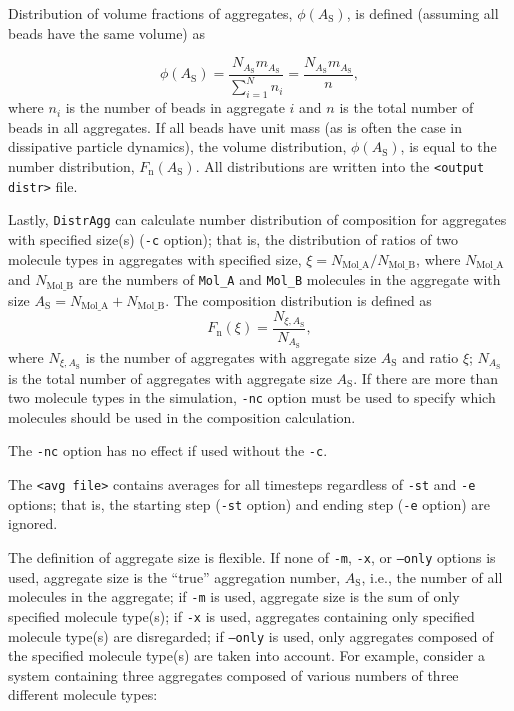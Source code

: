 Distribution of volume fractions of aggregates, $\phi(A_{\text{S}})$, is
defined (assuming all beads have the same volume) as

\begin{equation} \label{eq:Fvol}
  \phi(A_{\text{S}}) = \frac{N_{A_{\text{S}} } m_{A_{\text{S}} }}{\sum_{i=1}^N n_i} =
  \frac{N_{A_{\text{S}} } m_{A_{\text{S}} }}{n},
\end{equation}
where $n_i$ is the number of beads in aggregate $i$ and $n$ is the total
number of beads in all aggregates. If all beads have unit mass (as is often
the case in dissipative particle dynamics), the volume distribution,
$\phi(A_{\text{S}})$, is equal to the number distribution,
$F_{\text{n}}(A_{\text{S}})$.
All distributions are written into the \texttt{<output distr>} file.

Lastly, \texttt{DistrAgg} can calculate number distribution of composition
for aggregates with specified size(s) (\texttt{-c} option); that is, the
distribution of ratios of two molecule types in aggregates with specified
size, $\xi=N_{\text{Mol\_A}}/N_{\text{Mol\_B}}$, where $N_{\text{Mol\_A}}$
and $N_{\text{Mol\_B}}$ are the numbers of \texttt{Mol\_A} and
\texttt{Mol\_B} molecules in the aggregate with size
$A_{\text{S}}=N_{\text{Mol\_A}}+N_{\text{Mol\_B}}$.  The composition
distribution is defined as
\begin{equation} \label{eq:CompDistr}
  F_{\text{n}}(\xi) = \frac{N_{\xi,A_{\text{S}} }}{N_{A_{\text{S}}} },
\end{equation}
where $N_{\xi,A_{\text{S}} }$ is the number of aggregates with aggregate
size $A_{\text{S}}$ and ratio $\xi$; $N_{A_{\text{S}}}$ is the total
number of aggregates with aggregate size $A_{\text{S}}$.
If there are more than two molecule types in the simulation, \texttt{-nc}
option must be used to specify which molecules should be used in the
composition calculation.

The \texttt{-nc} option has no effect if used without the \texttt{-c}.

The \texttt{<avg file>} contains averages for all timesteps regardless of
\texttt{-st} and \texttt{-e} options; that is, the starting step
(\texttt{-st} option) and ending step (\texttt{-e} option) are ignored.

The definition of aggregate size is flexible. If none of \texttt{-m},
\texttt{-x}, or \texttt{--only} options is used, aggregate size is the
\enquote{true} aggregation number, $A_{\text{S}}$, i.e., the number of all
molecules in the aggregate; if \texttt{-m} is used, aggregate size is the
sum of only specified molecule type(s); if \texttt{-x} is used, aggregates
containing only specified molecule type(s) are disregarded; if
\texttt{--only} is used, only aggregates composed of the specified molecule
type(s) are taken into account. For example, consider a system containing
three aggregates composed of various numbers of three different molecule
types:

